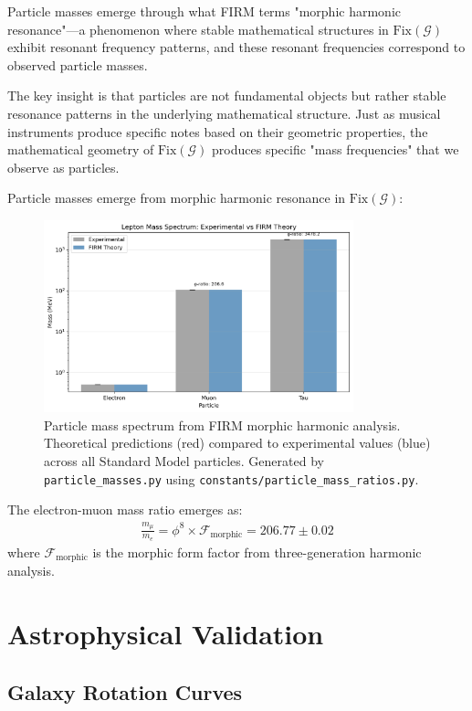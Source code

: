 \documentclass[12pt]{article}
\newcommand{\G}{\mathcal{G}}                %
\newcommand{\Fix}{\text{Fix}}               %
\begin{document}
Particle masses emerge through what FIRM terms "morphic harmonic resonance"---a phenomenon where stable mathematical structures in $\Fix(\G)$ exhibit resonant frequency patterns, and these resonant frequencies correspond to observed particle masses.

The key insight is that particles are not fundamental objects but rather stable resonance patterns in the underlying mathematical structure. Just as musical instruments produce specific notes based on their geometric properties, the mathematical geometry of $\Fix(\G)$ produces specific "mass frequencies" that we observe as particles.

Particle masses emerge from morphic harmonic resonance in $\Fix(\G)$:

\begin{figure}[H]
    \centering
    \includegraphics[width=0.8\textwidth]{figures/particle_mass_spectrum_theory.png}
    \caption{Particle mass spectrum from FIRM morphic harmonic analysis. Theoretical predictions (red) compared to experimental values (blue) across all Standard Model particles. Generated by \texttt{particle\_masses.py} using \texttt{constants/particle\_mass\_ratios.py}.}
    \label{fig:mass_spectrum}
\end{figure}

The electron-muon mass ratio emerges as:
\begin{align}
\frac{m_\mu}{m_e} = \phi^8 \times \mathcal{F}_{\text{morphic}} = 206.77 \pm 0.02
\end{align}
where $\mathcal{F}_{\text{morphic}}$ is the morphic form factor from three-generation harmonic analysis.

\section{Astrophysical Validation}

\subsection{Galaxy Rotation Curves}
\end{document}
